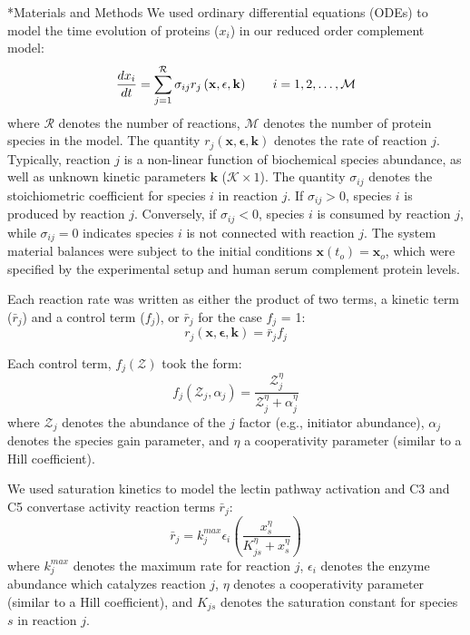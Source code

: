 \documentclass[12pt]{article}
\makeatletter
\renewcommand\section{\@startsection
	{subsection}{2}{0mm}
	{-0.2in}
	{0.05\baselineskip}
	{\normalfont\large\bfseries}}
\makeatother
\begin{document}
\section*{Materials and Methods}
We used ordinary differential equations (ODEs) to model the time evolution of proteins ($x_{i}$) in our reduced order complement model:
\begin{equation}
	\frac{dx_{i}}{dt}  =  \sum_{j = 1}^{\mathcal{R}}\sigma_{ij}r_{j}\left(\mathbf{x},\mathbf{\epsilon},\mathbf{k}\right)\qquad{i=1,2,\hdots,\mathcal{M}}\\
\end{equation}
where $\mathcal{R}$ denotes the number of reactions, $\mathcal{M}$ denotes the number of protein species in the model. 
The quantity $r_{j}\left(\mathbf{x},\mathbf{\epsilon},\mathbf{k}\right)$ denotes the rate of reaction $j$. 
Typically, reaction $j$ is a non-linear function of biochemical species abundance, as well as unknown kinetic parameters $\mathbf{k}$ ($\mathcal{K}\times{1}$). 
The quantity $\sigma_{ij}$ denotes the stoichiometric coefficient for species $i$ in reaction $j$. 
If $\sigma_{ij}>0$, species $i$ is produced by reaction $j$. 
Conversely, if $\sigma_{ij}<0$, species $i$ is consumed by reaction $j$, while $\sigma_{ij} = 0$ indicates species $i$ is not connected with reaction $j$. 
The system material balances were subject to the initial conditions $\mathbf{x}\left(t_{o}\right) = \mathbf{x}_{o}$, which were specified by the experimental setup and human serum complement protein levels.

Each reaction rate was written as either the product of two terms, a kinetic term ($\bar{r}_{j}$) and a control term ($f_{j}$), or $\bar{r}_{j}$ for the case $f_{j}$ = 1:
\begin{equation}\label{eqn:rate-factor}
	r_{j}\left(\mathbf{x},\mathbf{\epsilon},\mathbf{k}\right) = \bar{r}_{j}f_{j}
\end{equation}

Each control term, $f_{j}\left(\mathcal{Z}\right)$ took the form:
\begin{equation}\label{eqn:control-factor}
	f_{j}\left(\mathcal{Z}_{j},\alpha_{j}\right) = \frac{\mathcal{Z}_{j}^{\eta}}{\mathcal{Z}_{j}^{\eta} + \alpha_{j}^{\eta}}
\end{equation}where $\mathcal{Z}_{j}$ denotes the abundance of the $j$ factor (e.g., initiator abundance),
$\alpha_{j}$ denotes the species gain parameter, and $\eta$ a cooperativity parameter (similar to a Hill coefficient).


We used saturation kinetics to model the lectin pathway activation and C3 and C5 convertase activity reaction terms $\bar{r}_{j}$:
\begin{equation}\label{eqn:rate-saturation}
	\bar{r}_{j} = k_{j}^{max}\epsilon_{i}\left(\frac{x_{s}^{\eta}}{K_{js}^{\eta} + x_{s}^{\eta}}\right)
\end{equation}
where $k_{j}^{max}$ denotes the maximum rate for reaction $j$, $\epsilon_{i}$ denotes the enzyme abundance which catalyzes reaction $j$, $\eta$ denotes a cooperativity parameter (similar to a Hill coefficient),
and $K_{js}$ denotes the saturation constant for species $s$ in reaction $j$.
\end{document}
